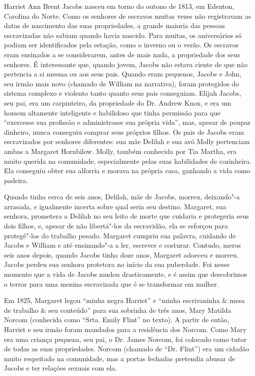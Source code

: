 Harriet Ann Brent Jacobs nasceu em torno do outono de 1813, em Edenton,
Carolina do Norte. Como os senhores de escravos muitas vezes não
registravam as datas de nascimento das suas propriedades, a grande
maioria das pessoas escravizadas não sabiam quando havia nascido. Para
muitas, os aniversários só podiam ser identificados pela estação, como o
inverno ou o verão. Os escravos eram ensinados a se considerarem, antes
de mais nada, a propriedade dos seus senhores. É interessante que,
quando jovem, Jacobs não estava ciente de que não pertencia a si mesma
ou aos seus pais. Quando eram pequenos, Jacobs e John, seu irmão mais
novo (chamado de William na narrativa), foram protegidos do sistema
complexo e violento tanto quanto seus pais conseguiam. Elijah Jacobs,
seu pai, era um carpinteiro, da propriedade do Dr. Andrew Knox, e
era um homem altamente inteligente e habilidoso que
tinha permissão para que ``exercesse sua profissão e administrasse
sua própria vida'', mas, apesar de poupar dinheiro, nunca conseguiu
comprar seus próprios filhos. Os pais de Jacobs eram escravizados por
senhores diferentes: sua mãe Delilah e sua avó Molly pertenciam ambas a
Margaret Hornbilow. Molly, também conhecida por Tia Martha, era muito
querida na comunidade, especialmente pelas suas habilidades de
cozinheira. Ela conseguiu obter sua alforria e morava na própria casa,
ganhando a vida como padeira.

Quando tinha cerca de seis anos, Delilah, mãe de Jacobs, morreu, deixando"-a
arrasada, e igualmente incerta sobre qual seria seu destino.
Margaret, sua senhora, prometera a Delilah no seu leito de morte que
cuidaria e protegeria seus dois filhos, e, apesar de não libertá"-los
da escravidão, ela se esforçou para protegê"-los do trabalho
pesado. Margaret cumpriu sua palavra, cuidando de Jacobs e William e até
ensinando"-a a ler, escrever e costurar. Contudo, meros seis anos depois,
quando Jacobs tinha doze anos, Margaret adoeceu e morreu. Jacobs perdeu
sua senhora protetora no início da sua puberdade. Foi nesse momento que
a vida de Jacobs mudou drasticamente, e é assim que descobrimos o terror
para uma menina escravizada que é se transformar em mulher.

Em 1825, Margaret legou ``minha negra Harriet'' e ``minha escrivaninha
\& mesa de trabalho \& seu conteúdo'' para sua sobrinha de três anos,
Mary Matilda Norcom (conhecida como ``Srta. Emily Flint'' no texto). A
partir de então, Harriet e seu irmão foram mandados para a residência
dos Norcom. Como Mary era uma criança pequena, seu pai, o Dr. James
Norcom, foi colocado como tutor de todas
as suas propriedades. Norcom (chamado de ``Dr. Flint'') era um cidadão
muito respeitado na comunidade, mas a portas fechadas pretendia abusar
de Jacobs e ter relações sexuais com ela.


